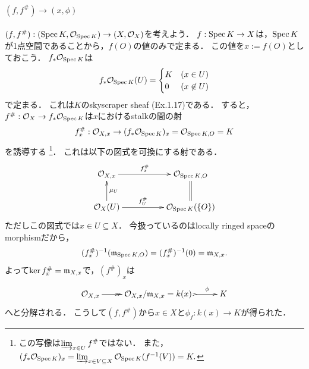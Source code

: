 \documentclass[a4paper]{jsarticle}
\begin{document}
    \paragraph{$(f,f^{\#}) \to (x, \phi)$}
    $(f, f^{\#}): (\operatorname{Spec} K, \mathcal{O}_{\operatorname{Spec} K}) \to (X, \mathcal{O}_X)$を考えよう．
    $f: \operatorname{Spec} K \to X$は，$\operatorname{Spec} K$が1点空間であることから，$f(O)$の値のみで定まる．
    この値を$x:=f(O)$としておこう．
    $f_* \mathcal{O}_{\operatorname{Spec} K}$は
    \[
        f_* \mathcal{O}_{\operatorname{Spec} K}(U)=
        \begin{cases}{}
            K & (x \in U) \\
            0 & (x \not \in U)
        \end{cases}
    \]
    で定まる．
    これは$K$のskyscraper sheaf (Ex.1.17)である．
    すると，$f^{\#}: \mathcal{O}_X \to f_* \mathcal{O}_{\operatorname{Spec} K}$は$x$におけるstalkの間の射
    \[ f^{\#}_{x}: \mathcal{O}_{X,x} \to (f_* \mathcal{O}_{\operatorname{Spec} K})_x=\mathcal{O}_{\operatorname{Spec} K,O}=K \]
    を誘導する
    \footnote
        {
            この写像は$\varinjlim_{x \in U}f^{\#}$ではない．
            また，$(f_* \mathcal{O}_{\operatorname{Spec} K})_x=\varinjlim_{x \in V \subseteq X} \mathcal{O}_{\operatorname{Spec} K}(f^{-1}(V))=K.$
        }．
    これは以下の図式を可換にする射である．
    \[
    \xymatrix@C=5em
    {
    \shO_{X,x} \ar[r]^-{f^{\#}_{x}} & \shO_{\Spec K,O} \\
    \shO_X(U) \ar[r]^-{f^{\#}_U} \ar[u]_-{\mu_U} & \shO_{\Spec K}(\{O\}) \ar@{=}[u]
    }
    \]
    ただしこの図式では$x \in U \subseteq X$．
    今扱っているのはlocally ringed spaceのmorphismだから，
    \[ (f^{\#}_{x})^{-1}(\mathfrak{m}_{\operatorname{Spec} K,O})=(f^{\#}_{x})^{-1}(0)=\mathfrak{m}_{X,x}. \]
    よって$\ker f^{\#}_{x}=\mathfrak{m}_{X,x}$で，$(f^{\#})_{x}$は
    \[ \xymatrix{ \shO_{X,x} \ar@{->>}[r]& \shO_{X,x}/\I{m}_{X,x}=k(x)~ \ar@{>->}[r]^-{\phi} & K } \]
    へと分解される．
    こうして$(f,f^{\#})$から$x \in X$と$\phi_f: k(x) \to K$が得られた．
\end{document}
